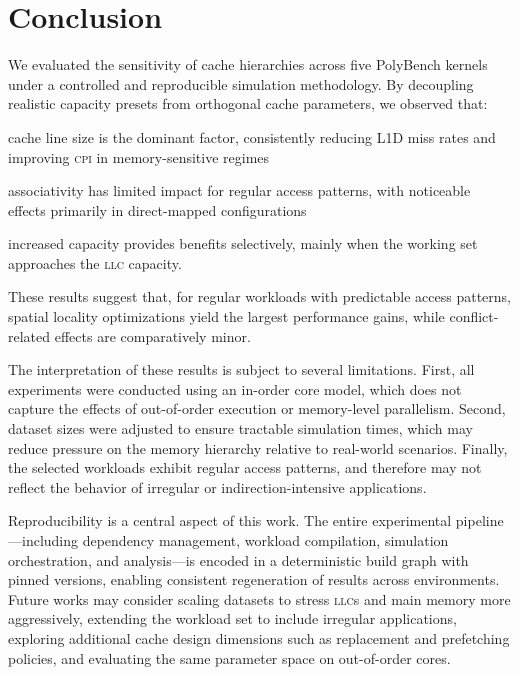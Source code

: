 \documentclass[conference]{IEEEtran}
\begin{document}
\section{Conclusion}

We evaluated the sensitivity of cache hierarchies across five PolyBench
kernels under a controlled and reproducible simulation methodology.
By decoupling realistic capacity presets from orthogonal cache parameters,
we observed that:
\begin{enumerate*}[label=(\alph*), itemjoin={;\ }, itemjoin*={; and\ }]
    \item cache line size is the dominant factor, consistently reducing L1D
    miss rates and improving \textsc{cpi} in memory-sensitive regimes
    \item associativity has limited impact for regular access patterns, with
    noticeable effects primarily in direct-mapped configurations
    \item increased capacity provides benefits selectively, mainly when the
    working set approaches the \textsc{llc} capacity.
\end{enumerate*}
These results suggest that, for regular workloads with predictable access
patterns, spatial locality optimizations yield the largest performance gains,
while conflict-related effects are comparatively minor.

The interpretation of these results is subject to several limitations. First,
all experiments were conducted using an in-order core model, which does not
capture the effects of out-of-order execution or memory-level parallelism.
Second, dataset sizes were adjusted to ensure tractable simulation times, which
may reduce pressure on the memory hierarchy relative to real-world scenarios.
Finally, the selected workloads exhibit regular access patterns, and therefore
may not reflect the behavior of irregular or indirection-intensive
applications.

Reproducibility is a central aspect of this work. The entire experimental
pipeline---including dependency management, workload compilation, simulation
orchestration, and analysis---is encoded in a deterministic build graph with
pinned versions, enabling consistent regeneration of results across
environments. Future works may consider scaling datasets to stress
\textsc{llc}s and main memory more aggressively, extending the workload set to
include irregular applications, exploring additional cache design dimensions
such as replacement and prefetching policies, and evaluating the same parameter
space on out-of-order cores.



\end{document}
